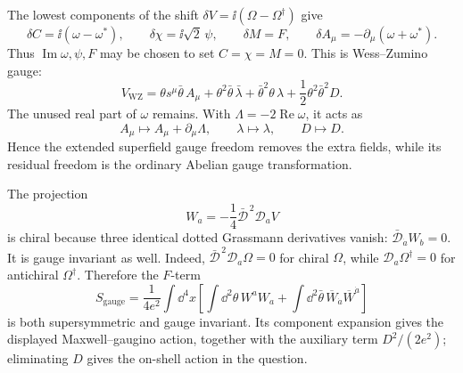 
\begin{enumerate}
The lowest components of the shift
  \(\delta V=\ii(\Omega-\Omega^\dagger)\) give
  \[
    \delta C=\ii(\omega-\omega^*),\qquad
    \delta\chi=\ii\sqrt2\,\psi,\qquad
    \delta M=F,\qquad
    \delta A_\mu=-\partial_\mu(\omega+\omega^*).
  \]
  Thus \(\operatorname{Im}\omega,\psi,F\) may be chosen to set
  \(C=\chi=M=0\).  This is Wess--Zumino gauge:
  \[
    V_{\mathrm{WZ}}
      =\theta s^\mu\bar\theta\,A_\mu
       +\theta^2\bar\theta\,\bar\lambda
       +\bar\theta^2\theta\,\lambda
       +\frac12\theta^2\bar\theta^2D.
  \]
  The unused real part of \(\omega\) remains.  With
  \(\Lambda=-2\operatorname{Re}\omega\), it acts as
  \[
    A_\mu\longmapsto A_\mu+\partial_\mu\Lambda,
    \qquad \lambda\longmapsto\lambda,\qquad D\longmapsto D.
  \]
  Hence the extended superfield gauge freedom removes the extra fields,
  while its residual freedom is the ordinary Abelian gauge transformation.

  The projection
  \[
    W_a=-\frac14\bar{\mathcal D}^{\,2}\mathcal D_aV
  \]
  is chiral because three identical dotted Grassmann derivatives vanish:
  \(\bar{\mathcal D}_{\dot a}W_b=0\).  It is gauge invariant as well.
  Indeed, \(\bar{\mathcal D}^{\,2}\mathcal D_a\Omega=0\) for chiral
  \(\Omega\), while
  \(\mathcal D_a\Omega^\dagger=0\) for antichiral
  \(\Omega^\dagger\).  Therefore the \(F\)-term
  \[
    S_{\mathrm{gauge}}
      =\frac1{4e^2}\int \dd^4x
       \left[\int \dd^2\theta\,W^aW_a
             +\int \dd^2\bar\theta\,
                \overline W_{\dot a}\overline W^{\dot a}\right]
  \]
  is both supersymmetric and gauge invariant.  Its component expansion
  gives the displayed Maxwell--gaugino action, together with the auxiliary
  term \(D^2/(2e^2)\); eliminating \(D\) gives the on-shell action in the
  question.


\end{enumerate}
